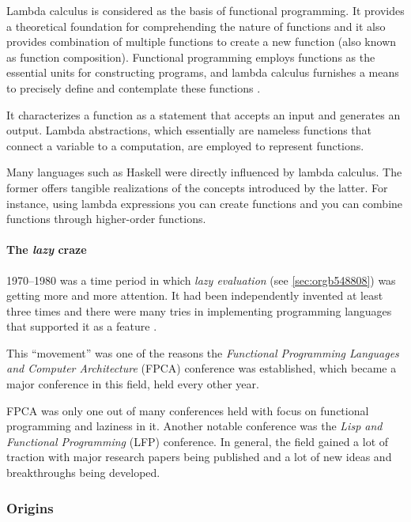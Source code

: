 \documentclass[a4paper, titlepage, twoside]{article}
\begin{document}
Lambda calculus is considered as the basis of functional programming. It provides a theoretical foundation for comprehending the nature of functions and it also provides combination of multiple functions to create a new function (also known as function composition). Functional programming employs functions as the essential units for constructing programs, and lambda calculus furnishes a means to precisely define and contemplate these functions  \autocite{pandaquestsRelationshipLambdaCalculus2023}.

It characterizes a function as a statement that accepts an input and generates an output. Lambda abstractions, which essentially are nameless functions that connect a variable to a computation, are employed to represent functions.

Many languages such as Haskell were directly influenced by lambda calculus. The former offers tangible realizations of the concepts introduced by the latter. For instance, using lambda expressions you can create functions and you can combine functions through higher-order functions.

\paragraph*{The \emph{lazy} craze}
\label{sec:org2ad8578}

1970--1980 was a time period in which \emph{lazy evaluation} (see \ref{sec:orgb548808}) was getting more and more attention. It had been independently invented at least three times and there were many tries in implementing programming languages that supported it as a feature \autocite{hudakHistoryHaskellBeing2007}.

This ``movement'' was one of the reasons the \emph{Functional Programming Languages and Computer Architecture} (FPCA) conference was established, which became a major conference in this field, held every other year.

FPCA was only one out of many conferences held with focus on functional programming and laziness in it. Another notable conference was the \emph{Lisp and Functional Programming} (LFP) conference. In general, the field gained a lot of traction with major research papers being published and a lot of new ideas and breakthroughs being developed.

\subsubsection{Origins}
\label{sec:org68931fb}
\end{document}
